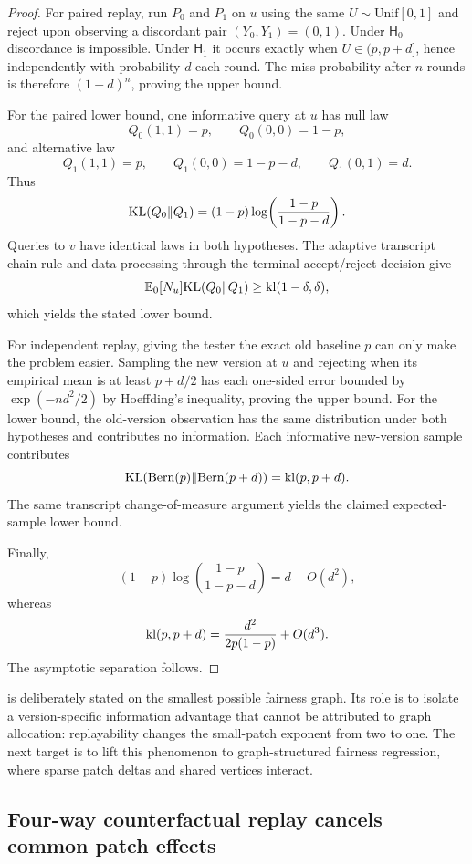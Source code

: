\begin{proof}
For paired replay, run $P_0$ and $P_1$ on $u$ using the same
$U\sim\mathrm{Unif}[0,1]$ and reject upon observing a discordant pair
$(Y_0,Y_1)=(0,1)$.  Under $\mathsf H_0$ discordance is impossible.  Under
$\mathsf H_1$ it occurs exactly when $U\in(p,p+d]$, hence independently with
probability $d$ each round.  The miss probability after $n$ rounds is therefore
$(1-d)^n$, proving the upper bound.

For the paired lower bound, one informative query at $u$ has null law
\[
Q_0(1,1)=p,
\qquad
Q_0(0,0)=1-p,
\]
and alternative law
\[
Q_1(1,1)=p,
\qquad
Q_1(0,0)=1-p-d,
\qquad
Q_1(0,1)=d.
\]
Thus
\[
\mathrm{KL}(Q_0\|Q_1)
=
(1-p)\log\!\left(\frac{1-p}{1-p-d}\right).
\]
Queries to $v$ have identical laws in both hypotheses.  The adaptive transcript
chain rule and data processing through the terminal accept/reject decision give
\[
\mathbb{E}_0[N_u]\mathrm{KL}(Q_0\|Q_1)
\ge
\mathrm{kl}(1-\delta,\delta),
\]
which yields the stated lower bound.

For independent replay, giving the tester the exact old baseline $p$ can only make
the problem easier.  Sampling the new version at $u$ and rejecting when its
empirical mean is at least $p+d/2$ has each one-sided error bounded by
$\exp(-nd^2/2)$ by Hoeffding's inequality, proving the upper bound.
For the lower bound, the old-version observation has the same distribution under
both hypotheses and contributes no information.  Each informative new-version
sample contributes
\[
\mathrm{KL}(\mathrm{Bern}(p)\|\mathrm{Bern}(p+d))
=
\mathrm{kl}(p,p+d).
\]
The same transcript change-of-measure argument yields the claimed expected-sample
lower bound.

Finally,
\[
(1-p)\log\!\left(\frac{1-p}{1-p-d}\right)
=
d+O(d^2),
\]
whereas
\[
\mathrm{kl}(p,p+d)
=
\frac{d^2}{2p(1-p)}+O(d^3).
\]
The asymptotic separation follows.
\end{proof}

 is deliberately stated on the smallest possible
fairness graph.  Its role is to isolate a version-specific information advantage
that cannot be attributed to graph allocation: replayability changes the
small-patch exponent from two to one.  The next target is to lift this phenomenon
to graph-structured fairness regression, where sparse patch deltas and shared
vertices interact.


\subsection{Four-way counterfactual replay cancels common patch effects}


